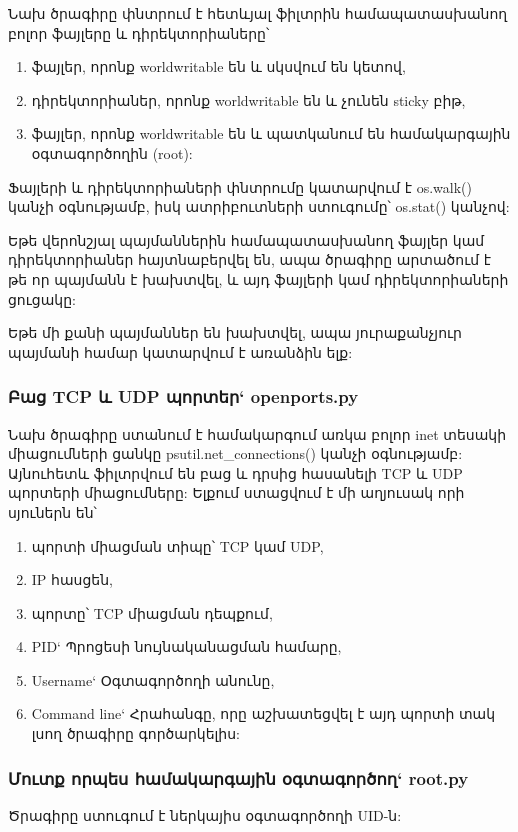 \documentclass[a4paper,12pt]{article}
\begin{document}
\begin{sloppypar}
Նախ ծրագիրը փնտրում է հետևյալ ֆիլտրին համապատասխանող բոլոր ֆայլերը և դիրեկտորիաները՝

\begin{enumerate}
\item ֆայլեր, որոնք worldwritable են և սկսվում են կետով,
\item դիրեկտորիաներ, որոնք worldwritable են և չունեն sticky բիթ,
\item ֆայլեր, որոնք worldwritable են և պատկանում են համակարգային օգտագործողին (root):
\end{enumerate}

Ֆայլերի և դիրեկտորիաների փնտրումը կատարվում է os.walk() կանչի օգնությամբ,
իսկ ատրիբուտների ստուգումը՝ os.stat() կանչով:

Եթե վերոնշյալ պայմաններին համապատասխանող ֆայլեր կամ դիրեկտորիաներ հայտնաբերվել են,
ապա ծրագիրը արտածում է թե որ պայմանն է խախտվել, և այդ ֆայլերի կամ դիրեկտորիաների
ցուցակը:

Եթե մի քանի պայմաններ են խախտվել, ապա յուրաքանչյուր պայմանի համար կատարվում է
առանձին ելք:


\subsubsection{Բաց TCP և UDP պորտեր` openports.py}


Նախ ծրագիրը ստանում է համակարգում առկա բոլոր inet տեսակի միացումների ցանկը
psutil.net\_connections() կանչի օգնությամբ:
Այնուհետև ֆիլտրվում են բաց և դրսից հասանելի TCP և UDP պորտերի միացումները:
Ելքում ստացվում է մի աղյուսակ որի սյուներն են՝

\begin{enumerate}
\item պորտի միացման տիպը՝ TCP կամ UDP,
\item IP հասցեն,
\item պորտը՝ TCP միացման դեպքում,
\item PID` Պրոցեսի նույնականացման համարը,
\item Username` Օգտագործողի անունը,
\item Command line` Հրահանգը, որը աշխատեցվել է այդ պորտի տակ լսող ծրագիրը գործարկելիս:
\end{enumerate}


\subsubsection{Մուտք որպես համակարգային օգտագործող` root.py}


Ծրագիրը ստուգում է ներկայիս օգտագործողի UID-ն:


\end{sloppypar}
\end{document}
